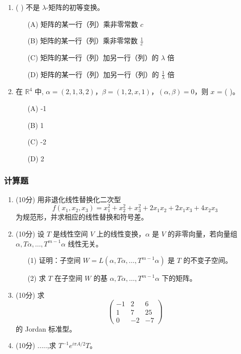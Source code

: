 \begin{enumerate}
    \item ( ) 不是 \(\lambda\)-矩阵的初等变换。
    \begin{enumerate}
        \item[(A)] 矩阵的某一行（列）乘非零常数 \(c\)
        \item[(B)] 矩阵的某一行（列）乘非零常数 \(\frac{1}{c}\)
        \item[(C)] 矩阵的某一行（列）加另一行（列）的 \(\lambda\) 倍
        \item[(D)] 矩阵的某一行（列）加另一行（列）的 \(\frac{1}{\lambda}\) 倍
    \end{enumerate}

    \item 在 \(\mathbb{R}^{4}\) 中, \(\alpha=(2,1,3,2)\)，\(\beta=(1,2,x,1)\)，\((\alpha,\beta)=0\)，则 \(x\) = ( )。
    \begin{enumerate}
        \item[(A)] -1
        \item[(B)] 1
        \item[(C)] -2
        \item[(D)] 2
    \end{enumerate}
\end{enumerate}

\subsubsection*{计算题}

\begin{enumerate}
    \item (10分) 用非退化线性替换化二次型
    \begin{equation*}
    f(x_{1},x_{2},x_{3})=x_{1}^{2}+x_{2}^{2}+x_{3}^{2}+2x_{1}x_{2}+2x_{1}x_{3}+4x_{2}x_{3}
    \end{equation*}
    为规范形，并求相应的线性替换和符号差。

    \item (10分) 设 \(T\) 是线性空间 \(V\) 上的线性变换，\(\alpha\) 是 \(V\) 的非零向量，若向量组 \(\alpha,T\alpha,\dots,T^{m-1}\alpha\) 线性无关。
    \begin{enumerate}
        \item[(1)] 证明：子空间 \(W=L(\alpha,T\alpha,\dots,T^{m-1}\alpha)\) 是 \(T\) 的不变子空间。
        \item[(2)] 求 \(T\) 在子空间 \(W\) 的基 \(\alpha,T\alpha,\dots,T^{m-1}\alpha\) 下的矩阵。
    \end{enumerate}

    \item (10分) 求
    \begin{equation*}
    \begin{pmatrix}-1 & 2 & 6 \\ 1 & 7 & 25 \\ 0 & -2 & -7\end{pmatrix}
    \end{equation*}
    的 Jordan 标准型。

    \item (10分) .....,求 \(T^{-1}e^{i\pi A/2}T\)。
\end{enumerate}

